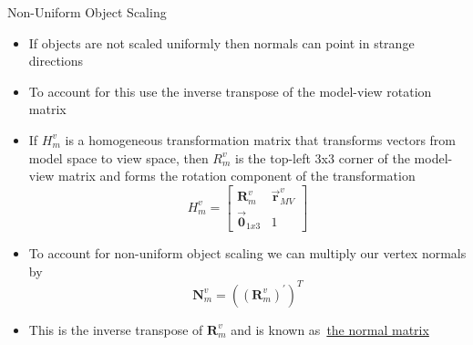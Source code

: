 \documentclass{beamer}
\newcommand{\hrefhand}[2]{\raisebox{-0.4ex}{\HandRight}\,\href{#1}{#2}}
\begin{document}
\begin{frame}[fragile]{Non-Uniform Object Scaling}
    \begin{itemize}
        \item If objects are not scaled uniformly then normals can point in strange directions
        \item To account for this use the inverse transpose of the model-view rotation matrix
        \item If $H^{v}_{m}$ is a homogeneous transformation matrix that transforms vectors from model space to view space, then $R^{v}_{m}$ is the top-left 3x3 corner of the model-view matrix and forms the rotation component of the transformation
              $$
                  H^{v}_{m} = \begin{bmatrix}
                      \bm{R}^{v}_{m}     & \bm{\vec{r}}^{v}_{MV} \\
                      \bm{\vec{0}}_{1x3} & 1
                  \end{bmatrix}
              $$
        \item To account for non-uniform object scaling we can multiply our vertex normals by
              $$\bm{N}^{v}_{m} = \left(\left(\bm{R}^{v}_{m}\right)^{'}\right)^{T}$$
        \item This is the inverse transpose of $\bm{R}^{v}_{m}$ and is known as \hrefhand{http://www.lighthouse3d.com/tutorials/glsl-12-tutorial/the-normal-matrix/}{\color{blue}the normal matrix}
    \end{itemize}
\end{frame}
\end{document}
